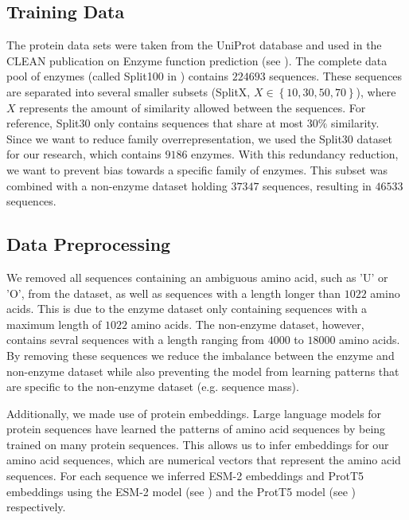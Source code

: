 \documentclass{bioinfo}
\begin{document}
\begin{methods}
\subsection{Training Data}

The protein data sets were taken from the UniProt database and used in the CLEAN publication on Enzyme function prediction (see \cite{CleanArticle}). 
The complete data pool of enzymes (called Split100 in \cite{CleanArticle}) contains $224693$ sequences. 
These sequences are separated into several smaller subsets (SplitX, $X \in \left\{10, 30, 50, 70\right\}$), where $X$ represents the amount of similarity allowed between the sequences.
For reference, Split30 only contains sequences that share at most $30\%$ similarity.
Since we want to reduce family overrepresentation, we used the Split30 dataset for our research,
which contains $9186$ enzymes.
With this redundancy reduction, we want to prevent bias towards a specific family of enzymes.
This subset was combined with a non-enzyme dataset holding $37347$ sequences, resulting in $46533$ sequences.

\subsection{Data Preprocessing}
We removed all sequences containing an ambiguous amino acid, such as 'U' or 'O', from the dataset, as well as
sequences with a length longer than $1022$ amino acids. 
This is due to the enzyme dataset only containing sequences with a maximum length of $1022$ amino acids.
The non-enzyme dataset, however, contains sevral sequences with a length ranging from $4000$ to $18000$ amino acids.
By removing these sequences we reduce the imbalance between the enzyme and non-enzyme dataset while also
preventing the model from learning patterns that are specific to the non-enzyme dataset (e.g. sequence mass).

Additionally, we made use of protein embeddings.
Large language models for protein sequences have learned the patterns of amino acid sequences by being trained on many protein sequences.
This allows us to infer embeddings for our amino acid sequences, which are numerical vectors that represent the amino acid sequences.
For each sequence we inferred ESM-2 embeddings and ProtT5 embeddings 
using the ESM-2 model (see \cite{ESM2}) and the ProtT5 model (see \cite{ProtT5}) respectively.



\end{methods}
\end{document}
